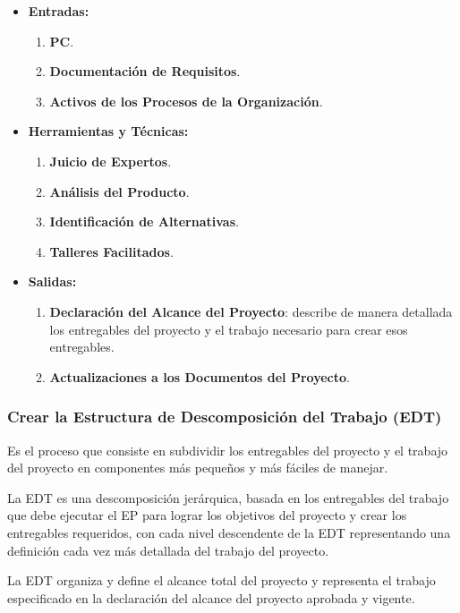 \documentclass[10pt,a4paper]{article}
\begin{document}
\begin{itemize}
\item \textbf{Entradas:}
\begin{enumerate}
\item \textbf{PC}.
\item \textbf{Documentación de Requisitos}.
\item \textbf{Activos de los Procesos de la Organización}.
\end{enumerate}

\item \textbf{Herramientas y Técnicas:}
\begin{enumerate}
\item \textbf{Juicio de Expertos}.
\item \textbf{Análisis del Producto}.
\item \textbf{Identificación de Alternativas}.
\item \textbf{Talleres Facilitados}.
\end{enumerate}

\item \textbf{Salidas:}
\begin{enumerate}
\item \textbf{Declaración del Alcance del Proyecto}: describe de manera detallada los entregables del proyecto y el trabajo necesario para crear esos entregables.
\item \textbf{Actualizaciones a los Documentos del Proyecto}.
\end{enumerate}
\end{itemize}

\subsubsection{Crear la Estructura de Descomposición del Trabajo (EDT)} 
Es el proceso que consiste en subdividir los entregables del proyecto y el trabajo del proyecto en componentes más pequeños y más fáciles de manejar.

La EDT es una descomposición jerárquica, basada en los entregables del trabajo que debe ejecutar el EP para lograr los objetivos del proyecto y crear los entregables requeridos, con cada nivel descendente de la EDT representando una definición cada vez más detallada del trabajo del proyecto.

La EDT organiza y define el alcance total del proyecto y representa el trabajo especificado en la declaración del alcance del proyecto aprobada y vigente.
\end{document}
